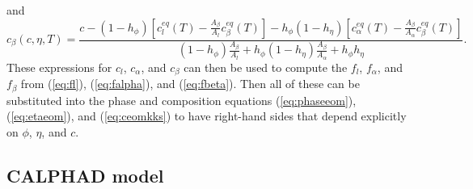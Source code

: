 %
and
%
\begin{equation}
  c_\beta(c,\eta,T) =
  \frac{ c -
    (1 - h_\phi) \left[ c_l^\mathit{eq}(T) - 
      \frac{A_\beta}{A_l} c_\beta^\mathit{eq}(T) \right] -
    h_\phi ( 1 - h_\eta ) \left[ c_\alpha^\mathit{eq}(T) -
      \frac{A_\beta}{A_\alpha} c_\beta^\mathit{eq}(T) \right] }
    { (1 - h_\phi) \frac{A_\beta}{A_l} +
      h_\phi (1 - h_\eta) \frac{A_\beta}{A_\alpha} +
      h_\phi h_\eta }.
\label{eq:cbeta}
\end{equation}
%
These expressions for $c_l$, $c_\alpha$, and $c_\beta$ can then be
used to compute the $f_l$, $f_\alpha$, and $f_\beta$ from
(\ref{eq:fl}), (\ref{eq:falpha}), and (\ref{eq:fbeta}).  Then all of
these can be substituted into the phase and composition equations
(\ref{eq:phaseeom}), (\ref{eq:etaeom}), and (\ref{eq:ceomkks}) to have
right-hand sides that depend explicitly on $\phi$, $\eta$, and $c$.


%
\subsection{CALPHAD model}
\label{sec:calphad}

